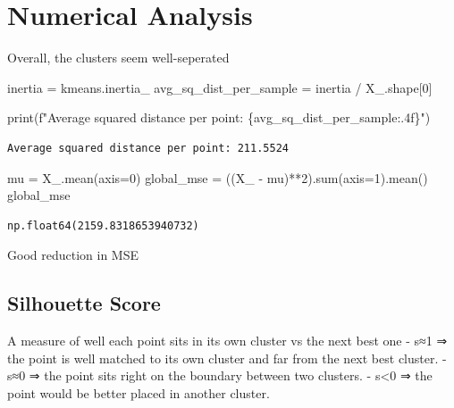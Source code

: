 \documentclass[
  letterpaper,
  DIV=11,
  numbers=noendperiod]{scrreprt}
\newenvironment{Shaded}{\begin{snugshade}}{\end{snugshade}}
\newcommand{\BuiltInTok}[1]{\textcolor[rgb]{0.00,0.23,0.31}{#1}}
\newcommand{\DecValTok}[1]{\textcolor[rgb]{0.68,0.00,0.00}{#1}}
\newcommand{\NormalTok}[1]{\textcolor[rgb]{0.00,0.23,0.31}{#1}}
\newcommand{\OperatorTok}[1]{\textcolor[rgb]{0.37,0.37,0.37}{#1}}
\newcommand{\SpecialCharTok}[1]{\textcolor[rgb]{0.37,0.37,0.37}{#1}}
\newcommand{\SpecialStringTok}[1]{\textcolor[rgb]{0.13,0.47,0.30}{#1}}
\begin{document}
\section{Numerical Analysis}\label{numerical-analysis}

Overall, the clusters seem well-seperated

\begin{Shaded}
\begin{Highlighting}[]
\NormalTok{inertia }\OperatorTok{=}\NormalTok{ kmeans.inertia\_}
\NormalTok{avg\_sq\_dist\_per\_sample }\OperatorTok{=}\NormalTok{ inertia }\OperatorTok{/}\NormalTok{ X\_.shape[}\DecValTok{0}\NormalTok{]}

\BuiltInTok{print}\NormalTok{(}\SpecialStringTok{f"Average squared distance per point: }\SpecialCharTok{\{}\NormalTok{avg\_sq\_dist\_per\_sample}\SpecialCharTok{:.4f\}}\SpecialStringTok{"}\NormalTok{)}
\end{Highlighting}
\end{Shaded}

\begin{verbatim}
Average squared distance per point: 211.5524
\end{verbatim}

\begin{Shaded}
\begin{Highlighting}[]
\NormalTok{mu }\OperatorTok{=}\NormalTok{ X\_.mean(axis}\OperatorTok{=}\DecValTok{0}\NormalTok{)}
\NormalTok{global\_mse }\OperatorTok{=}\NormalTok{ ((X\_ }\OperatorTok{{-}}\NormalTok{ mu)}\OperatorTok{**}\DecValTok{2}\NormalTok{).}\BuiltInTok{sum}\NormalTok{(axis}\OperatorTok{=}\DecValTok{1}\NormalTok{).mean()}
\NormalTok{global\_mse}
\end{Highlighting}
\end{Shaded}

\begin{verbatim}
np.float64(2159.8318653940732)
\end{verbatim}

Good reduction in MSE

\subsection{Silhouette Score}\label{silhouette-score}

A measure of well each point sits in its own cluster vs the next best
one - s≈1 ⇒ the point is well matched to its own cluster and far from
the next best cluster. - s≈0 ⇒ the point sits right on the boundary
between two clusters. - s\textless0 ⇒ the point would be better placed
in another cluster.
\end{document}
